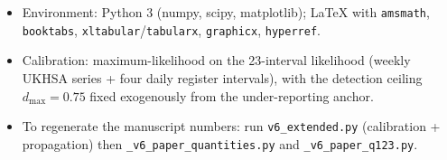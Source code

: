 \documentclass[11pt]{article}
\begin{document}
\begin{itemize}
  \item Environment: Python 3 (numpy, scipy, matplotlib); LaTeX with
        \texttt{amsmath}, \texttt{booktabs}, \texttt{xltabular}/\texttt{tabularx},
        \texttt{graphicx}, \texttt{hyperref}.
  \item Calibration: maximum-likelihood on the 23-interval likelihood
        (weekly UKHSA series + four daily register intervals), with the
        detection ceiling $d_{\max}=0.75$ fixed exogenously from the
        under-reporting anchor.
  \item To regenerate the manuscript numbers: run \texttt{v6\_extended.py}
        (calibration + propagation) then \texttt{\_v6\_paper\_quantities.py}
        and \texttt{\_v6\_paper\_q123.py}.
\end{itemize}
\end{document}

